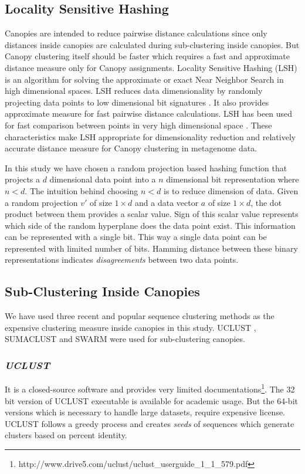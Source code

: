 \documentclass[10pt, conference, compsocconf]{IEEEtran}
\begin{document}
\subsection{\textbf{Locality Sensitive Hashing}}

Canopies are intended to reduce pairwise distance calculations since only distances inside canopies are calculated during sub-clustering inside canopies. But Canopy clustering itself should be faster which requires a fast and approximate distance measure only for Canopy assignments. Locality Sensitive Hashing (LSH) \cite{MARLshRef2} is an algorithm for solving the approximate or exact Near Neighbor Search in high dimensional spaces. LSH reduces data dimensionality by randomly projecting data points to low dimensional bit signatures \cite{MARLshRef4}. It also provides approximate measure for fast pairwise distance calculations. LSH has been used for fast comparison between points in very high dimensional space \cite{MARLshRef3}. These characteristics make LSH appropriate for dimensionality reduction and relatively accurate distance measure for Canopy clustering in metagenome data.

In this study we have chosen a random projection based hashing function that projects a $d$ dimensional data point into a $n$ dimensional bit representation where $n<d$. The intuition behind choosing $n<d$ is to reduce dimension of data. Given a random projection $v'$ of size $1 \times d$ and a data vector $a$ of size $1 \times d$, the dot product between them provides a scalar value. Sign of this scalar value represents which side of the random hyperplane does the data point exist. This information can be represented with a single bit. This way a single data point can be represented with limited number of bits. Hamming distance between these binary representations indicates \textit{disagreements} between two data points.

\subsection{\textbf{Sub-Clustering Inside Canopies}}
\label{sub-cluster}
We have used three recent and popular sequence clustering methods as the expensive clustering measure inside canopies in this study. UCLUST \cite{MARuclust}, SUMACLUST \cite{MARSumaclust} and SWARM \cite{MARSwarm} were used for sub-clustering canopies. 

\subsubsection{\textit{UCLUST}}
It is a closed-source software and provides very limited documentations\footnote{http://www.drive5.com/uclust/uclust\_userguide\_1\_1\_579.pdf}. The 32 bit version of UCLUST executable is available for academic usage. But the 64-bit versions which is necessary to handle large datasets, require expensive license. UCLUST follows a greedy process and creates \textit{seeds} of sequences which generate clusters based on percent identity.
\end{document}
